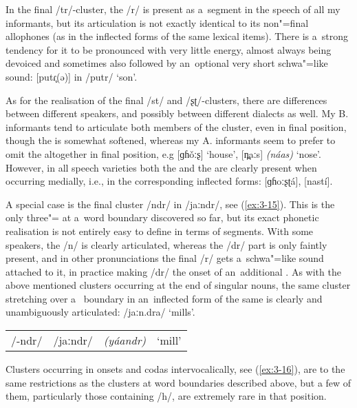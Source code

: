 In the final /tr/-cluster, the /r/ is present as a~segment in the speech of all my informants, but its articulation is not exactly identical to its non"=final allophones (as in the inflected forms of the same lexical items). There is a~strong tendency for it to be pronounced with very little energy, almost always being devoiced and sometimes also followed by an~optional very short schwa"=like sound: [putɾ̥(ə)] in /putr/ `son'. 


As for the realisation of the final /st/ and /ʂʈ/-clusters, there are differences between different speakers, and possibly between different dialects as well. My B. informants tend to articulate both members of the cluster, even in final position, though the  is somewhat softened, whereas my A. informants seem to prefer to omit the  altogether in final position, e.g [ɡɦ\v{o}ːʂ] `house', [n̪aːs] \textit{(náas)} `nose'. However, in all speech varieties both the  and the  are clearly present when occurring medially, i.e., in the corresponding inflected forms: [ɡɦoːʂʈá], [nastí].


A special case is the final cluster /ndr/ in /jaːndr/, see (\ref{ex:3-15}). This is the only three"= at a~word boundary discovered so far, but its exact phonetic realisation is not entirely easy to define in terms of segments. With some speakers, the /n/ is clearly articulated, whereas the /dr/ part is only faintly present, and in other pronunciations the final /r/ gets a~schwa"=like sound attached to it, in practice making /dr/ the onset of an~additional . As with the above mentioned clusters occurring at the end of singular nouns, the same cluster stretching over a~ boundary in an~inflected form of the same  is clearly and unambiguously articulated: /jaːn.dra/ `mills'.


\begin{exe}
\extab
\label{ex:3-15}
\begin{tabular}{ l l l l }
/-ndr/ &
/jaːndr/ &
\textit{(yáandr)} &
`mill'\\
\end{tabular}
\end{exe}


Clusters occurring in  onsets and  codas intervocalically, see (\ref{ex:3-16}), are  to the same restrictions as the clusters at word boundaries described above, but a few of them, particularly those containing /h/, are extremely rare in that position. 


